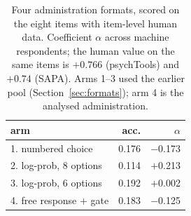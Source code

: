 \begin{table}[t]
\caption{Four administration formats, scored on the eight items with item-level human data. Coefficient $\alpha$ across machine respondents; the human value on the same items is $+0.766$ (psychTools) and $+0.74$ (SAPA). Arms 1--3 used the earlier pool (Section~\ref{sec:formats}); arm 4 is the analysed administration.}
\label{tab:arms}\centering
\begin{tabular}{lrr}\toprule
arm & acc. & $\alpha$ \\\midrule
1. numbered choice & 0.176 & $-$0.173 \\
2. log-prob, 8 options & 0.114 & $+$0.213 \\
3. log-prob, 6 options & 0.192 & $+$0.002 \\
4. free response + gate & 0.183 & $-$0.125 \\
\bottomrule\end{tabular}\end{table}
